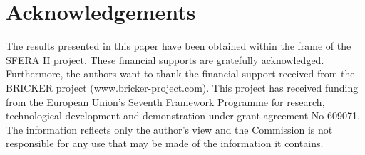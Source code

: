 \documentclass[final,3p,times,review]{elsarticle}
\begin{document}
\section{Acknowledgements}
%
The results presented in this paper have been obtained within the frame of the SFERA II project. These financial supports are gratefully acknowledged.
Furthermore, the authors want to thank the financial support received from the BRICKER project (www.bricker-project.com). This project has received funding from the European Union’s Seventh Framework Programme for research, technological development and demonstration under grant agreement No 609071. The information reflects only the author’s view and the Commission is not responsible for any use that may be made of the information it contains.

%
\clearpage


\end{document}
